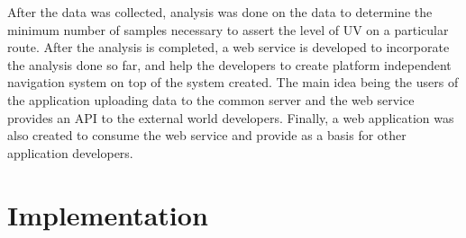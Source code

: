 \documentclass[10pt]{sigplan-proc-varsize}
\begin{document}
After the data was collected, analysis was done on the data to determine the minimum number of samples necessary to assert the level of UV on a particular route. After the analysis is completed, a web service is developed to incorporate the analysis done so far, and help the developers to create platform independent navigation system on top of the system created. The main idea being the users of the application uploading data to the common server and the web service provides an API to the external world developers. Finally, a web application was also created to consume the web service and provide as a basis for other application developers. 

\section{Implementation}
\end{document}

